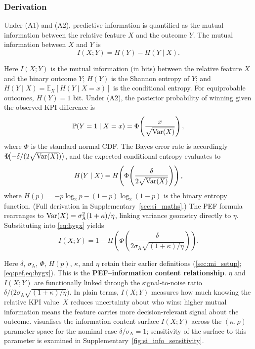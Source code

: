 \subsubsection{Derivation}

Under (A1) and (A2), predictive information is quantified as the mutual information between the relative feature $X$ and the outcome $Y$. The mutual information \parencite{shannon1948,cover2006} between $X$ and $Y$ is
\begin{equation}
  I(X;Y) = H(Y) - H(Y\mid X).
  \label{eq:mi_def}
\end{equation}

\noindent Here $I(X;Y)$ is the mutual information (in bits) between the relative feature $X$ and the binary outcome $Y$; $H(Y)$ is the Shannon entropy of $Y$; and $H(Y\mid X)=\mathbb{E}_{X}[H(Y\mid X=x)]$ is the conditional entropy. For equiprobable outcomes, $H(Y)=1$ bit. Under (A2), the posterior probability of winning given the observed KPI difference is
\[
  \mathbb{P}(Y=1\mid X=x) = \Phi\!\left(\frac{x}{\sqrt{\operatorname{Var}(X)}}\right),
\]
where $\Phi$ is the standard normal CDF. The Bayes error rate is accordingly $\Phi\!\bigl(-\delta/(2\sqrt{\operatorname{Var}(X)})\bigr)$, and the expected conditional entropy evaluates to
\begin{equation}
  H(Y\mid X) = H\!\left(\Phi\!\left(\frac{\delta}{2\sqrt{\operatorname{Var}(X)}}\right)\right),
  \label{eq:hygx}
\end{equation}
where $H(p)=-p\log_{2}p-(1-p)\log_{2}(1-p)$ is the binary entropy function. (Full derivation in Supplementary~\cref{sec:si_maths}.) The PEF formula rearranges to $\operatorname{Var}(X)=\sigma^{2}_{\mathrm{A}}(1+\kappa)/\eta$, linking variance geometry directly to $\eta$. Substituting into \cref{eq:hygx} yields
\begin{equation}
  I(X;Y) = 1 - H\!\left(\Phi\!\left(\frac{\delta}{2\sigma_{\mathrm{A}}\sqrt{(1+\kappa)/\eta}}\right)\right).
  \label{eq:mi_closed}
\end{equation}

\noindent Here $\delta$, $\sigma_{\mathrm{A}}$, $\Phi$, $H(p)$, $\kappa$, and $\eta$ retain their earlier definitions (\cref{sec:mi_setup}; \cref{eq:pef,eq:hygx}). This is the \textbf{PEF--information content relationship}. $\eta$ and $I(X;Y)$ are functionally linked through the signal-to-noise ratio $\delta/\bigl(2\sigma_{\mathrm{A}}\sqrt{(1+\kappa)/\eta}\bigr)$. In plain terms, $I(X;Y)$ measures how much knowing the relative KPI value~$X$ reduces uncertainty about who wins: higher mutual information means the feature carries more decision-relevant signal about the outcome.  visualises the information content surface $I(X;Y)$ across the $(\kappa,\rho)$ parameter space for the nominal case $\delta/\sigma_{\mathrm{A}}=1$; sensitivity of the surface to this parameter is examined in Supplementary~\cref{fig:si_info_sensitivity}.

